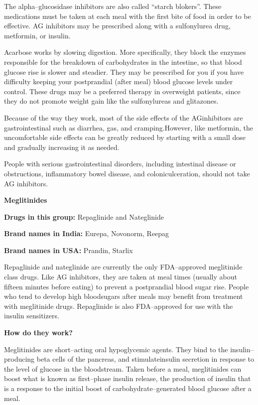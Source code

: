 The alpha–glucosidase inhibitors are also called “starch blokers”. These medications must be taken at each meal with the first bite of food in order to be effective. AG inhibitors may be prescribed along with a sulfonylurea drug, metformin, or insulin.

Acarbose works by slowing digestion. More specifically, they block the enzymes responsible for the breakdown of carbohydrates in the intestine, so that blood glucose rise is slower and steadier. They may be prescribed for you if you have difficulty keeping your postprandial (after meal) blood glucose levels under control. These drugs may be a preferred therapy in overweight patients, since they do not promote weight gain like the sulfonylureas and glitazones.

Because of the way they work, most of the side effects of the AG\break inhibitors are gastrointestinal such as diarrhea, gas, and cramping.\break However, like metformin, the uncomfortable side effects can be greatly reduced by starting with a small dose and gradually increasing it as needed.

People with serious gastrointestinal disorders, including intestinal disease or obstructions, inflammatory bowel disease, and colonic\break ulceration, should not take AG inhibitors.

\textbf{Meglitinides}

\textbf{Drugs in this group:} Repaglinide and Nateglinide

\textbf{Brand names in India:} Eurepa, Novonorm, Reepag

\textbf{Brand names in USA:} Prandin, Starlix

Repaglinide and nateglinide are currently the only FDA–approved meglitinide class drugs. Like AG inhibitors, they are taken at meal times (usually about fifteen minutes before eating) to prevent a postprandial blood sugar rise. People who tend to develop high blood\break sugars after meals may benefit from treatment with meglitinide drugs. Repaglinide is also FDA–approved for use with the insulin sensitizers.

\noindent\textbf{How do they work?}

Meglitinides are short–acting oral hypoglycemic agents. They bind to the insulin–producing beta cells of the pancreas, and stimulate\break insulin secretion in response to the level of glucose in the bloodstream. Taken before a meal, meglitinides can boost what is known as first–phase insulin release, the production of insulin that is a response to the initial boost of carbohydrate–generated blood glucose after a meal.

